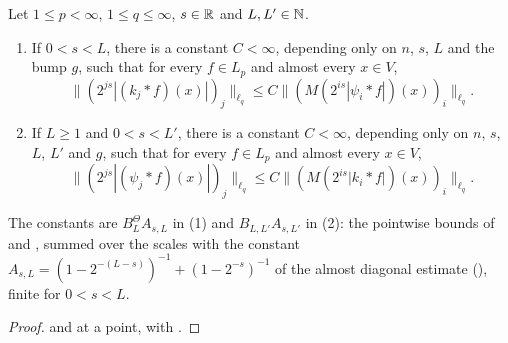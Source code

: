 \begin{lemma}
\label{lem:tl-local-means-lq}
\leanok
{}
Let $1 \leq p < \infty$, $1 \leq q \leq \infty$, $s \in \mathbb{R}$ and $L, L' \in \mathbb{N}$.
\begin{enumerate}
  \item If $0 < s < L$, there is a constant $C < \infty$, depending only on $n$, $s$, $L$ and the
    bump $g$, such that for every $f \in L_p$ and almost every $x \in V$,
    \[
      \bigl\| (2^{js} |(k_j * f)(x)|)_j \bigr\|_{\ell_q} \leq C
      \bigl\| (M(2^{is} |\psi_i * f|)(x))_i \bigr\|_{\ell_q} .
    \]
  \item If $L \geq 1$ and $0 < s < L'$, there is a constant $C < \infty$, depending only on $n$,
    $s$, $L$, $L'$ and $g$, such that for every $f \in L_p$ and almost every $x \in V$,
    \[
      \bigl\| (2^{js} |(\psi_j * f)(x)|)_j \bigr\|_{\ell_q} \leq C
      \bigl\| (M(2^{is} |k_i * f|)(x))_i \bigr\|_{\ell_q} .
    \]
\end{enumerate}
\end{lemma}

The constants are $B^\Theta_L A_{s,L}$ in (1) and $B_{L,L'} A_{s,L'}$ in (2): the pointwise
bounds of  and , summed over the
scales with the constant $A_{s,L} = (1 - 2^{-(L-s)})^{-1} + (1 - 2^{-s})^{-1}$ of the almost
diagonal estimate (), finite for $0 < s < L$.

\begin{proof}
\leanok
{} and  at a point, with
.
\end{proof}

